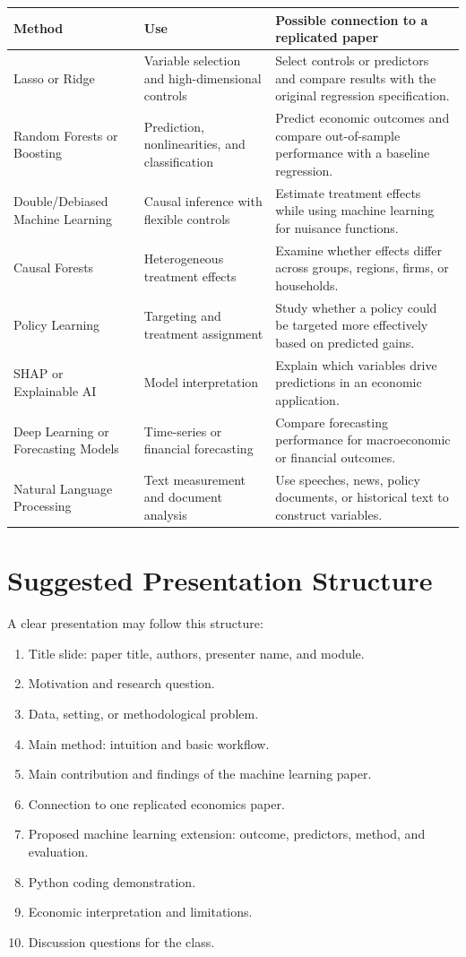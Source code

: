 \documentclass[11pt]{article}
\newcommand{\coloredsection}[1]{\vspace{2pt}\section*{\large\textcolor{sectioncolor}{#1}}\vspace{-2pt}}
\begin{document}
\begin{tabularx}{\textwidth}{>{\raggedright\arraybackslash}p{} >{\raggedright\arraybackslash}p{} X}
\toprule
\textbf{Method} & \textbf{Use} & \textbf{Possible connection to a replicated paper} \\
\midrule
Lasso or Ridge & Variable selection and high-dimensional controls & Select controls or predictors and compare results with the original regression specification. \\
Random Forests or Boosting & Prediction, nonlinearities, and classification & Predict economic outcomes and compare out-of-sample performance with a baseline regression. \\
Double/Debiased Machine Learning & Causal inference with flexible controls & Estimate treatment effects while using machine learning for nuisance functions. \\
Causal Forests & Heterogeneous treatment effects & Examine whether effects differ across groups, regions, firms, or households. \\
Policy Learning & Targeting and treatment assignment & Study whether a policy could be targeted more effectively based on predicted gains. \\
SHAP or Explainable AI & Model interpretation & Explain which variables drive predictions in an economic application. \\
Deep Learning or Forecasting Models & Time-series or financial forecasting & Compare forecasting performance for macroeconomic or financial outcomes. \\
Natural Language Processing & Text measurement and document analysis & Use speeches, news, policy documents, or historical text to construct variables. \\
\bottomrule
\end{tabularx}

\coloredsection{Suggested Presentation Structure}

A clear presentation may follow this structure:

\begin{enumerate}
    \item Title slide: paper title, authors, presenter name, and module.
    \item Motivation and research question.
    \item Data, setting, or methodological problem.
    \item Main method: intuition and basic workflow.
    \item Main contribution and findings of the machine learning paper.
    \item Connection to one replicated economics paper.
    \item Proposed machine learning extension: outcome, predictors, method, and evaluation.
    \item Python coding demonstration.
    \item Economic interpretation and limitations.
    \item Discussion questions for the class.
\end{enumerate}
\end{document}
